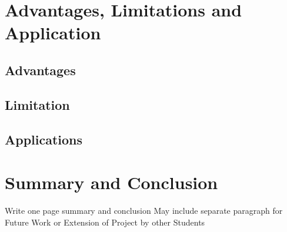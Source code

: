 \documentclass[oneside,a4paper,12pt]{report}
\begin{document}
\chapter{Advantages, Limitations and Application}
\section{Advantages}
\section{Limitation}
\section{Applications}


\chapter*{Summary and Conclusion}
Write one page summary and conclusion 
May include separate paragraph for Future Work or Extension of Project by other Students




\end{document}
